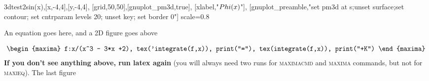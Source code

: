 \documentclass[mastertmp.tex]{subfiles}
\begin{document}
\begin{maximaplot}{3d}{test2}{sin(x),[x,-4,4],[y,-4,4],
			[grid,50,50],[gnuplot_pm3d,true],
			[xlabel,"$\\Phi(x)$"],
			[gnuplot_preamble,"set pm3d at s;unset surface;set contour;
			set cntrparam levels 20; unset key; set border 0"]}
			{scale=0.8}
\end{maximaplot}

An equation goes here, and a 2D figure goes above

\[
 \begin{maxima}
 f:x/(x^3 - 3*x +2),
 tex('integrate(f,x)),
 print("="),
 tex(integrate(f,x)),
 print("+K")
 \end{maxima}
\]
\textbf{If you don't see anything above, run latex again} (you will always
need two runs for \textsc{maximacmd} and \textsc{maxima} commands, but
not for \textsc{maxieq}). The last figure
\end{document}
